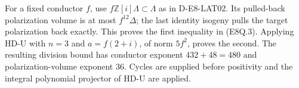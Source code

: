 For a fixed conductor \(f\), use
\(f\mathbb Z[i]\Lambda\subset\Lambda\) as in D-E8-LAT02.
Its pulled-back polarization volume is at most
\(f^{12}\Delta\); the last identity isogeny pulls the
target polarization back exactly. This proves the first
inequality in (E8Q.3). Applying HD-U with \(n=3\) and
\(a=f(2+i)\), of norm \(5f^2\), proves the second.
The resulting division bound has conductor exponent
\(432+48=480\) and polarization-volume exponent \(36\).
Cycles are supplied before positivity and the integral
polynomial projector of HD-U are applied.
